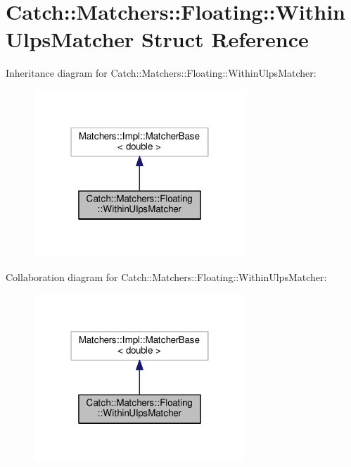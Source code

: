 \hypertarget{structCatch_1_1Matchers_1_1Floating_1_1WithinUlpsMatcher}{}\section{Catch\+:\+:Matchers\+:\+:Floating\+:\+:Within\+Ulps\+Matcher Struct Reference}
\label{structCatch_1_1Matchers_1_1Floating_1_1WithinUlpsMatcher}


Inheritance diagram for Catch\+:\+:Matchers\+:\+:Floating\+:\+:Within\+Ulps\+Matcher\+:\nopagebreak
\begin{figure}[H]
\begin{center}
\leavevmode
\includegraphics[width=226pt]{structCatch_1_1Matchers_1_1Floating_1_1WithinUlpsMatcher__inherit__graph}
\end{center}
\end{figure}


Collaboration diagram for Catch\+:\+:Matchers\+:\+:Floating\+:\+:Within\+Ulps\+Matcher\+:\nopagebreak
\begin{figure}[H]
\begin{center}
\leavevmode
\includegraphics[width=226pt]{structCatch_1_1Matchers_1_1Floating_1_1WithinUlpsMatcher__coll__graph}
\end{center}
\end{figure}
